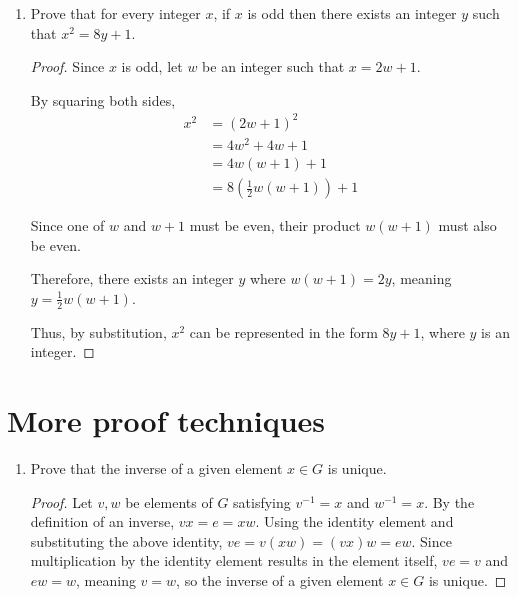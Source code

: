 \documentclass{article}
\begin{document}
\begin{enumerate}
  \item Prove that for every integer $x$, if $x$ is odd then there
    exists an integer $y$ such that $x^2 = 8y + 1$.

    \begin{proof}
      Since $x$ is odd, let $w$ be an integer such that $x=2w+1$.

      By squaring both sides,
      \begin{align}
        x^2 &= (2w+1)^2 \\
        &= 4w^2+4w+1 \\
        &= 4w(w+1)+1 \\
        &= 8(\frac{1}{2}w(w+1))+1
      \end{align}

      Since one of $w$ and $w+1$ must be even, their product $w(w+1)$
      must also be even.

      Therefore, there exists an integer $y$ where $w(w+1)=2y$,
      meaning $y=\frac{1}{2}w(w+1)$.

      Thus, by substitution, $x^2$ can be represented in the form
      $8y+1$, where $y$ is an integer.
    \end{proof}

\end{enumerate}

\section{More proof techniques}

\begin{enumerate}

  \item Prove that the inverse of a given element $x \in G$ is unique.

    \begin{proof}
      Let $v,w$ be elements of $G$ satisfying $v^{-1}=x$ and $w^{-1}=x$.
      By the definition of an inverse, $vx=e=xw$.
      Using the identity element and substituting the above identity,
      $ve=v(xw)=(vx)w=ew$.
      Since multiplication by the identity element results in the
      element itself, $ve=v$ and $ew=w$, meaning $v=w$, so the
      inverse of a given element $x \in G$ is unique.
    \end{proof}

\end{enumerate}
\end{document}
